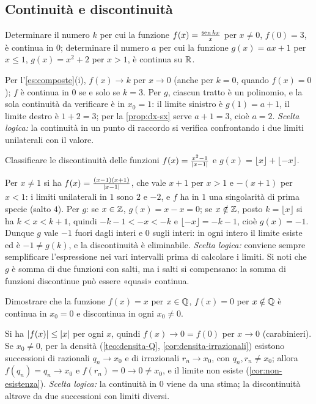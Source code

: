\subsection*{Continuità e discontinuità}

\begin{esercizio}
Determinare il numero $k$ per cui la funzione $f(x)=\frac{\operatorname{sen} kx}{x}$ per $x\neq0$,
$f(0)=3$, è continua in $0$; determinare il numero $a$ per cui la funzione
$g(x)=ax+1$ per $x\le1$, $g(x)=x^{2}+2$ per $x>1$, è continua su $\mathbb{R}$.
\begin{soluzione}
Per l'\cref{es:composte}(i), $f(x)\to k$ per $x\to0$ (anche per $k=0$, quando
$f(x)=0$); $f$ è continua in $0$ se e solo se $k=3$. Per $g$, ciascun tratto è un
polinomio, e la sola continuità da verificare è in $x_{0}=1$: il limite sinistro è
$g(1)=a+1$, il limite destro è $1+2=3$; per la \cref{prop:dx-sx} serve $a+1=3$, cioè
$a=2$. \emph{Scelta logica:} la continuità in un punto di raccordo si verifica
confrontando i due limiti unilaterali con il valore.
\end{soluzione}
\end{esercizio}

\begin{esercizio}
Classificare le discontinuità delle funzioni $f(x)=\frac{x^{2}-1}{\lvert x-1\rvert}$ e
$g(x)=\lfloor x\rfloor+\lfloor-x\rfloor$.
\begin{soluzione}
Per $x\neq1$ si ha $f(x)=\frac{(x-1)(x+1)}{\lvert x-1\rvert}$, che vale $x+1$ per $x>1$ e
$-(x+1)$ per $x<1$: i limiti unilaterali in $1$ sono $2$ e $-2$, e $f$ ha in $1$ una
singolarità di prima specie (salto $4$). Per $g$: se $x\in\mathbb{Z}$, $g(x)=x-x=0$; se
$x\notin\mathbb{Z}$, posto $k=\lfloor x\rfloor$ si ha $k<x<k+1$, quindi $-k-1<-x<-k$ e
$\lfloor-x\rfloor=-k-1$, cioè $g(x)=-1$. Dunque $g$ vale $-1$ fuori dagli interi e $0$
sugli interi: in ogni intero il limite esiste ed è $-1\neq g(k)$, e la discontinuità è
eliminabile. \emph{Scelta logica:} conviene sempre semplificare l'espressione nei vari
intervalli prima di calcolare i limiti. Si noti che $g$ è somma di due funzioni con
salti, ma i salti si compensano: la somma di funzioni discontinue può essere «quasi»
continua.
\end{soluzione}
\end{esercizio}

\begin{esercizio}
Dimostrare che la funzione $f(x)=x$ per $x\in\mathbb{Q}$, $f(x)=0$ per $x\notin\mathbb{Q}$ è continua in
$x_{0}=0$ e discontinua in ogni $x_{0}\neq0$.
\begin{soluzione}
Si ha $\lvert f(x)\rvert\le\lvert x\rvert$ per ogni $x$, quindi $f(x)\to0=f(0)$ per $x\to0$ (carabinieri).
Se $x_{0}\neq0$, per la densità (\cref{teo:densita-Q}, \cref{cor:densita-irrazionali})
esistono successioni di razionali $q_{n}\to x_{0}$ e di irrazionali $r_{n}\to x_{0}$, con
$q_{n},r_{n}\neq x_{0}$; allora $f(q_{n})=q_{n}\to x_{0}$ e $f(r_{n})=0\to0\neq x_{0}$, e il
limite non esiste (\cref{cor:non-esistenza}). \emph{Scelta logica:} la continuità in $0$
viene da una stima; la discontinuità altrove da due successioni con limiti diversi.
\end{soluzione}
\end{esercizio}

